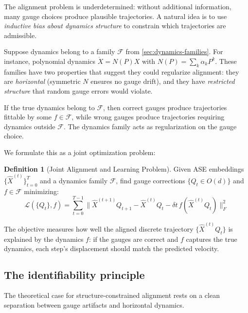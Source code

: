 \documentclass{article}
\theoremstyle{plain}
\theoremstyle{definition}
\newtheorem{definition}{Definition}
\theoremstyle{remark}
\begin{document}
The alignment problem is underdetermined: without additional information, many gauge choices produce plausible trajectories.
A natural idea is to use \emph{inductive bias about dynamics structure} to constrain which trajectories are admissible.

Suppose dynamics belong to a family $\mathcal{F}$ from \cref{sec:dynamics-families}. For instance, polynomial dynamics $\dot{X} = N(P) X$ with $N(P) = \sum_k \alpha_k P^k$.
These families have two properties that suggest they could regularize alignment:
they are \emph{horizontal} (symmetric $N$ ensures no gauge drift), and they have \emph{restricted structure} that random gauge errors would violate.

If the true dynamics belong to $\mathcal{F}$, then correct gauges produce trajectories fittable by some $f \in \mathcal{F}$, while wrong gauges produce trajectories requiring dynamics outside $\mathcal{F}$.
The dynamics family acts as regularization on the gauge choice.

We formulate this as a joint optimization problem:

\begin{definition}[Joint Alignment and Learning Problem]
Given ASE embeddings $\{\hat{X}^{(t)}\}_{t=0}^T$ and a dynamics family $\mathcal{F}$, find gauge corrections $\{Q_t \in O(d)\}$ and $f \in \mathcal{F}$ minimizing:
\begin{equation}
\mathcal{L}(\{Q_t\}, f) = \sum_{t=0}^{T-1} \|\hat{X}^{(t+1)} Q_{t+1} - \hat{X}^{(t)} Q_t - \delta t \, f(\hat{X}^{(t)} Q_t)\|_F^2
\end{equation}
\end{definition}

The objective measures how well the aligned discrete trajectory $\{\hat{X}^{(t)} Q_t\}$ is explained by the dynamics $f$: if the gauges are correct and $f$ captures the true dynamics, each step's displacement should match the predicted velocity.


\subsection{The identifiability principle}

The theoretical case for structure-constrained alignment rests on a clean separation between gauge artifacts and horizontal dynamics.
\end{document}
